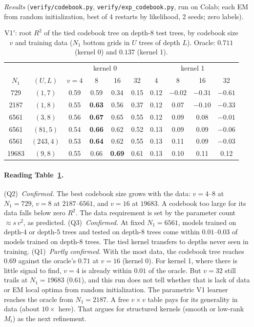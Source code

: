 \documentclass[11pt]{article}
\theoremstyle{definition}
\begin{document}
\emph{Results} (\texttt{verify/codebook.py}, \texttt{verify/exp\_codebook.py}, run on Colab; each EM
from random initialization, best of 4 restarts by likelihood, 2 seeds; zero labels).

\begin{table}[h]\centering
\caption{V1$'$: root $R^2$ of the tied codebook tree on depth-8 test trees, by codebook size $v$ and
training data ($N_1$ bottom grids in $U$ trees of depth $L$). Oracle: $0.711$ (kernel 0) and $0.137$
(kernel 1).}\label{tab:v1p}
\small\begin{tabular}{cc|cccc|cccc}\toprule
&& \multicolumn{4}{c|}{kernel 0} & \multicolumn{4}{c}{kernel 1}\\
$N_1$ & $(U,L)$ & $v=4$ & 8 & 16 & 32 & 4 & 8 & 16 & 32\\\midrule
729 & $(1,7)$ & 0.59 & 0.59 & 0.34 & 0.15 & 0.12 & $-0.02$ & $-0.31$ & $-0.61$\\
2187 & $(1,8)$ & 0.55 & \textbf{0.63} & 0.56 & 0.37 & 0.12 & 0.07 & $-0.10$ & $-0.33$\\
6561 & $(3,8)$ & 0.56 & \textbf{0.67} & 0.65 & 0.55 & 0.12 & 0.09 & 0.08 & $-0.01$\\
6561 & $(81,5)$ & 0.54 & \textbf{0.66} & 0.62 & 0.52 & 0.13 & 0.09 & 0.09 & $-0.06$\\
6561 & $(243,4)$ & 0.53 & \textbf{0.64} & 0.62 & 0.55 & 0.13 & 0.11 & 0.09 & $-0.03$\\
19683 & $(9,8)$ & 0.55 & 0.66 & \textbf{0.69} & 0.61 & 0.13 & 0.10 & 0.11 & 0.12\\
\bottomrule\end{tabular}
\end{table}

\paragraph{Reading Table~\ref{tab:v1p}.}
(Q2)~\emph{Confirmed.} The best codebook size grows with the data: $v=4$--$8$ at $N_1=729$, $v=8$ at
$2187$--$6561$, and $v=16$ at $19683$. A codebook too large for its data falls below zero $R^2$. The data
requirement is set by the parameter count $\approx s\,v^2$, as predicted.
(Q3)~\emph{Confirmed.} At fixed $N_1=6561$, models trained on depth-4 or depth-5 trees and tested on
depth-8 trees come within $0.01$--$0.03$ of models trained on depth-8 trees. The tied kernel transfers
to depths never seen in training.
(Q1)~\emph{Partly confirmed.} With the most data, the codebook tree reaches $0.69$ against the oracle's
$0.71$ at $v=16$ (kernel 0). For kernel 1, where there is little signal to find, $v=4$ is already within
$0.01$ of the oracle. But $v=32$ still trails at $N_1=19683$ ($0.61$), and this run does not tell whether
that is lack of data or EM local optima from random initialization. The parametric V1 learner reaches
the oracle from $N_1=2187$. A free $v\times v$ table pays for its generality in data (about $10\times$ here).
That argues for structured kernels (smooth or low-rank $M_i$) as the next refinement.
\end{document}
